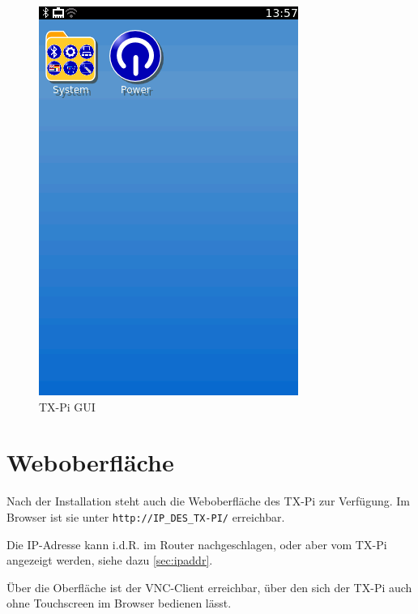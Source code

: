 \documentclass[
  paper=A4,
  ngerman,
  fontsize=12pt,
  parskip=half-,
]{scrbook}
\begin{document}
\begin{figure}[h]
\centering
\includegraphics[scale=0.5]{images/gui-start.png}
\caption{TX-Pi GUI}
\end{figure}


\chapter{Weboberfläche}

Nach der Installation steht auch die Weboberfläche des TX-Pi zur Verfügung.
Im Browser ist sie unter \texttt{http://IP\_DES\_TX-PI/} erreichbar.

Die IP-Adresse kann i.d.R. im Router nachgeschlagen, oder aber
vom TX-Pi angezeigt werden, siehe dazu \ref{sec:ipaddr}.

Über die Oberfläche ist der VNC-Client erreichbar, über den
sich der TX-Pi auch ohne Touchscreen im Browser bedienen lässt.
\end{document}
